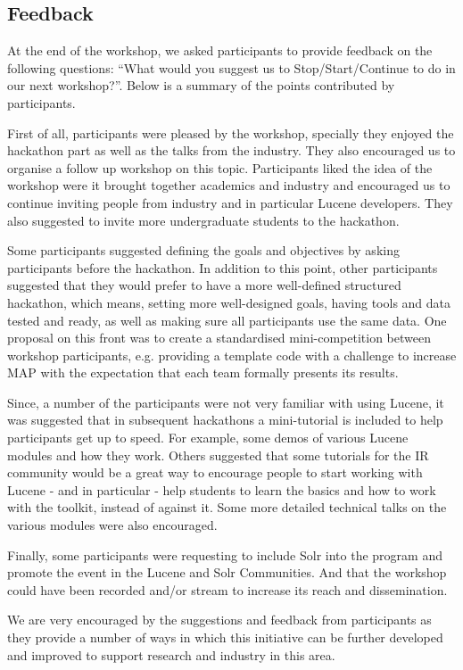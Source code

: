 \subsection{Feedback}

At the end of the workshop, we asked participants to provide feedback on the following questions: ``What would you suggest us to Stop/Start/Continue to do in our next workshop?''. Below is a summary of the points contributed by participants.

First of all, participants were pleased by the workshop, specially they enjoyed the hackathon part as well as the talks from the industry.  They also encouraged us to organise a follow up workshop on this topic. Participants liked the idea of the workshop were it brought together academics and industry and encouraged us to continue inviting people from industry and in particular Lucene developers. They also suggested to invite more undergraduate students to the hackathon.

Some participants suggested defining the goals and objectives by asking participants before the hackathon.  In addition to this point, other participants suggested that they would prefer to have a more well-defined structured hackathon, which means, setting more well-designed goals, having tools and data tested and ready, as well as making sure all participants use the same data.  One proposal on this front was to create a standardised mini-competition between workshop participants, e.g. providing a template code with a challenge to increase MAP with the expectation that each team formally presents its results.

Since, a number of the participants were not very familiar with using Lucene, it was suggested that in subsequent hackathons a mini-tutorial is included to help participants get up to speed. For example, some demos of various Lucene modules and how they work. Others suggested that some tutorials for the IR community would be a great way to encourage people to start working with Lucene - and in particular - help students to learn the basics and how to work with the toolkit, instead of against it. Some more detailed technical talks on the various modules were also encouraged.

Finally, some participants were requesting to include Solr into the program and promote the event in the Lucene and Solr Communities. And that the workshop could have been recorded and/or stream to increase its reach and dissemination. 

We are very encouraged by the suggestions and feedback from participants as they provide a number of ways in which this initiative can be further developed and improved to support research and industry in this area.
